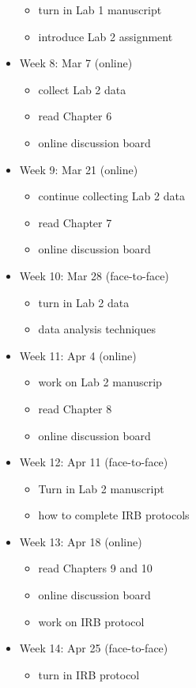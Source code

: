 \documentclass[10pt]{article}
\begin{document}
\begin{itemize}
\begin{itemize}
\item turn in Lab 1 manuscript
\item introduce Lab 2 assignment
\end{itemize}
\item Week 8: Mar 7 (online)
\begin{itemize}
\item collect Lab 2 data
\item read Chapter 6
\item online discussion board
\end{itemize}
\item Week 9: Mar 21 (online)
\begin{itemize}
\item continue collecting Lab 2 data
\item read Chapter 7
\item online discussion board
\end{itemize}
\item Week 10: Mar 28 (face-to-face)
\begin{itemize}
\item turn in Lab 2 data
\item data analysis techniques
\end{itemize}
\item Week 11: Apr 4 (online)
\begin{itemize}
\item work on Lab 2 manuscrip
\item read Chapter 8
\item online discussion board
\end{itemize}
\item Week 12: Apr 11 (face-to-face)
\begin{itemize}
\item Turn in Lab 2 manuscript
\item how to complete IRB protocols
\end{itemize}
\item Week 13: Apr 18 (online)
\begin{itemize}
\item read Chapters 9 and 10
\item online discussion board
\item work on IRB protocol
\end{itemize}
\item Week 14: Apr 25 (face-to-face)
\begin{itemize}
\item turn in IRB protocol

\end{itemize}
\end{itemize}
\end{document}
